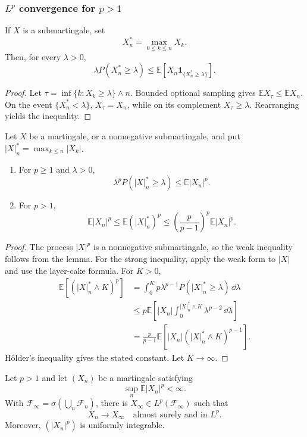 \subsubsection{\texorpdfstring{$L^p$}{Lp} convergence for \texorpdfstring{$p>1$}{p greater than 1}}

\begin{lem}
If $X$ is a submartingale, set
\[
X_n^*=\max_{0\leq k\leq n}X_k.
\]
Then, for every $\lambda>0$,
\[
\lambda P(X_n^*\geq\lambda)
 \leq\mathbb E[X_n\mathbf1_{\{X_n^*\geq\lambda\}}].
\]
\end{lem}

\begin{proof}
Let $\tau=\inf\{k:X_k\geq\lambda\}\wedge n$. Bounded optional sampling gives
$\mathbb EX_\tau\leq\mathbb EX_n$. On the event
$\{X_n^*<\lambda\}$, $X_\tau=X_n$, while on its complement
$X_\tau\geq\lambda$. Rearranging yields the inequality.
\end{proof}

\begin{thm}
Let $X$ be a martingale, or a nonnegative submartingale, and put
$|X|_n^*=\max_{k\leq n}|X_k|$.
\begin{enumerate}[label=(\roman*)]
  \item For $p\geq1$ and $\lambda>0$,
  \[
  \lambda^pP(|X|_n^*\geq\lambda)
   \leq\mathbb E|X_n|^p.
  \]
  \item For $p>1$,
  \[
  \mathbb E|X_n|^p
   \leq\mathbb E(|X|_n^*)^p
   \leq\left(\frac p{p-1}\right)^p\mathbb E|X_n|^p.
  \]
\end{enumerate}
\end{thm}

\begin{proof}
The process $|X|^p$ is a nonnegative submartingale, so the weak inequality
follows from the lemma. For the strong inequality, apply the weak form to
$|X|$ and use the layer-cake formula. For $K>0$,
\begin{align*}
\mathbb E[(|X|_n^*\wedge K)^p]
&=\int_0^Kp\lambda^{p-1}P(|X|_n^*\geq\lambda)\,\dd\lambda\\
&\leq p\mathbb E\!\left[
 |X_n|\int_0^{|X|_n^*\wedge K}\lambda^{p-2}\,\dd\lambda
 \right]\\
&=\frac p{p-1}
 \mathbb E[|X_n|(|X|_n^*\wedge K)^{p-1}].
\end{align*}
Hölder's inequality gives the stated constant. Let $K\to\infty$.
\end{proof}

\begin{thm}
Let $p>1$ and let $(X_n)$ be a martingale satisfying
\[
\sup_n\mathbb E|X_n|^p<\infty.
\]
With $\mathcal F_\infty=\sigma(\bigcup_n\mathcal F_n)$, there is
$X_\infty\in L^p(\mathcal F_\infty)$ such that
\[
X_n\to X_\infty
\quad\text{almost surely and in }L^p.
\]
Moreover, $(|X_n|^p)$ is uniformly integrable.
\end{thm}

